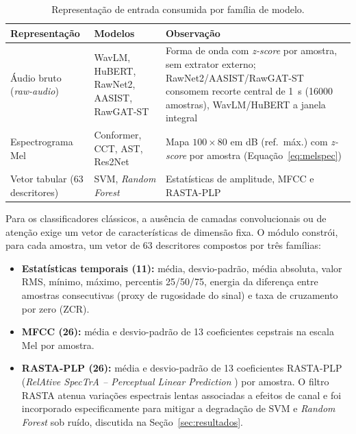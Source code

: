\documentclass[12pt,a4paper]{article}
\begin{document}
\begin{table}[H]
\centering
\caption{Representação de entrada consumida por família de modelo.}
\label{tab:representacoes_entrada}
\small
\begin{tabular}{@{}>{\raggedright\arraybackslash}p{3.2cm}
                >{\raggedright\arraybackslash}p{4.6cm}
                >{\raggedright\arraybackslash}p{6.2cm}@{}}
\toprule
\textbf{Representação} & \textbf{Modelos} & \textbf{Observação} \\
\midrule
Áudio bruto (\textit{raw-audio}) & WavLM, HuBERT, RawNet2, AASIST, RawGAT-ST &
Forma de onda com \textit{z-score} por amostra, sem extrator externo;
RawNet2/AASIST/RawGAT-ST consomem recorte central de \SI{1}{\second}
(\num{16000} amostras), WavLM/HuBERT a janela integral \\
\addlinespace
Espectrograma Mel & Conformer, CCT, AST, Res2Net &
Mapa $100 \times 80$ em dB (ref.\ máx.) com \textit{z-score} por amostra
(Equação~\ref{eq:melspec}) \\
\addlinespace
Vetor tabular (\num{63} descritores) & SVM, \textit{Random Forest} &
Estatísticas de amplitude, MFCC e RASTA-PLP \\
\bottomrule
\end{tabular}
\end{table}

Para os classificadores clássicos, a ausência de camadas convolucionais ou de
atenção exige um vetor de características de dimensão fixa. O módulo
 constrói, para cada amostra, um vetor de
\num{63} descritores compostos por três famílias:
\begin{itemize}
    \item \textbf{Estatísticas temporais (11):} média, desvio-padrão, média
    absoluta, valor RMS, mínimo, máximo, percentis 25/50/75, energia da
    diferença entre amostras consecutivas (proxy de rugosidade do sinal) e
    taxa de cruzamento por zero (ZCR).
    \item \textbf{MFCC (26):} média e desvio-padrão de \num{13} coeficientes
    cepstrais na escala Mel por amostra.
    \item \textbf{RASTA-PLP (26):} média e desvio-padrão de \num{13}
    coeficientes RASTA-PLP (\textit{RelAtive SpecTrA -- Perceptual Linear
    Prediction} \cite{hermansky1994rasta}) por amostra. O filtro RASTA atenua
    variações espectrais lentas associadas a efeitos de canal e foi incorporado
    especificamente para mitigar a degradação de SVM e \textit{Random Forest}
    sob ruído, discutida na Seção~\ref{sec:resultados}.
\end{itemize}
\end{document}
